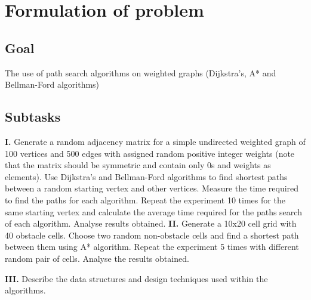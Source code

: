 \section*{Formulation of problem}

\subsection*{Goal}

The use of path search algorithms on weighted graphs (Dijkstra's, A* and Bellman-Ford algorithms)

\subsection*{Subtasks}
\textbf{I.} Generate a random adjacency matrix for a simple undirected weighted graph of 100 vertices and 500 edges with assigned random positive integer weights (note that the matrix should be symmetric and contain only 0s and weights as elements).
Use Dijkstra's and Bellman-Ford algorithms to find shortest paths between a random starting vertex and other vertices. Measure the time required to find the paths for each algorithm. Repeat the experiment 10 times for the same starting vertex and calculate the average time required for the paths search of each algorithm. Analyse results obtained.
\textbf{II.} Generate a 10x20 cell grid with 40 obstacle cells. Choose two random non-obstacle cells and find a shortest path between them using A* algorithm. Repeat the experiment 5 times with different random pair of cells. Analyse the results obtained. 

\textbf{III.} Describe the data structures and design techniques used within the algorithms.